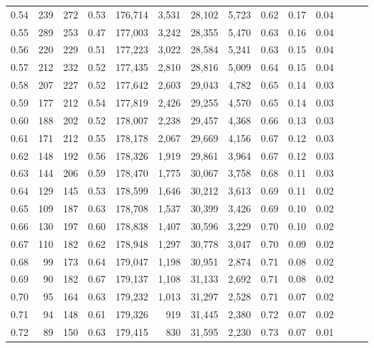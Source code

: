 \begin{tabular}{rrrrrrrrrrrrrr}
0.54 &     239 &  272 &  0.53 &  176,714 &    3,531 &  28,102 &   5,723 &  0.62 &  0.17 &      0.04 \\
0.55 &     289 &  253 &  0.47 &  177,003 &    3,242 &  28,355 &   5,470 &  0.63 &  0.16 &      0.04 \\
0.56 &     220 &  229 &  0.51 &  177,223 &    3,022 &  28,584 &   5,241 &  0.63 &  0.15 &      0.04 \\
0.57 &     212 &  232 &  0.52 &  177,435 &    2,810 &  28,816 &   5,009 &  0.64 &  0.15 &      0.04 \\
0.58 &     207 &  227 &  0.52 &  177,642 &    2,603 &  29,043 &   4,782 &  0.65 &  0.14 &      0.03 \\
0.59 &     177 &  212 &  0.54 &  177,819 &    2,426 &  29,255 &   4,570 &  0.65 &  0.14 &      0.03 \\
0.60 &     188 &  202 &  0.52 &  178,007 &    2,238 &  29,457 &   4,368 &  0.66 &  0.13 &      0.03 \\
0.61 &     171 &  212 &  0.55 &  178,178 &    2,067 &  29,669 &   4,156 &  0.67 &  0.12 &      0.03 \\
0.62 &     148 &  192 &  0.56 &  178,326 &    1,919 &  29,861 &   3,964 &  0.67 &  0.12 &      0.03 \\
0.63 &     144 &  206 &  0.59 &  178,470 &    1,775 &  30,067 &   3,758 &  0.68 &  0.11 &      0.03 \\
0.64 &     129 &  145 &  0.53 &  178,599 &    1,646 &  30,212 &   3,613 &  0.69 &  0.11 &      0.02 \\
0.65 &     109 &  187 &  0.63 &  178,708 &    1,537 &  30,399 &   3,426 &  0.69 &  0.10 &      0.02 \\
0.66 &     130 &  197 &  0.60 &  178,838 &    1,407 &  30,596 &   3,229 &  0.70 &  0.10 &      0.02 \\
0.67 &     110 &  182 &  0.62 &  178,948 &    1,297 &  30,778 &   3,047 &  0.70 &  0.09 &      0.02 \\
0.68 &      99 &  173 &  0.64 &  179,047 &    1,198 &  30,951 &   2,874 &  0.71 &  0.08 &      0.02 \\
0.69 &      90 &  182 &  0.67 &  179,137 &    1,108 &  31,133 &   2,692 &  0.71 &  0.08 &      0.02 \\
0.70 &      95 &  164 &  0.63 &  179,232 &    1,013 &  31,297 &   2,528 &  0.71 &  0.07 &      0.02 \\
0.71 &      94 &  148 &  0.61 &  179,326 &      919 &  31,445 &   2,380 &  0.72 &  0.07 &      0.02 \\
0.72 &      89 &  150 &  0.63 &  179,415 &      830 &  31,595 &   2,230 &  0.73 &  0.07 &      0.01 \\

\end{tabular}
